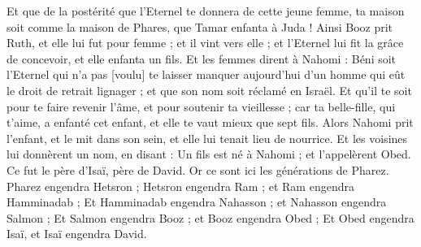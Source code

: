 \begin{multicols}{2}
Et que de la postérité que l'Eternel te donnera de cette jeune femme, ta maison soit comme la maison de Phares, que Tamar enfanta à Juda !
Ainsi Booz prit Ruth, et elle lui fut pour femme ; et il vint vers elle ; et l'Eternel lui fit la grâce de concevoir, et elle enfanta un fils.
Et les femmes dirent à Nahomi : Béni soit l'Eternel qui n'a pas [voulu] te laisser manquer aujourd'hui d'un homme qui eût le droit de retrait lignager ; et que son nom soit réclamé en Israël.
Et qu'il te soit pour te faire revenir l'âme, et pour soutenir ta vieillesse ; car ta belle-fille, qui t'aime, a enfanté cet enfant, et elle te vaut mieux que sept fils.
Alors Nahomi prit l'enfant, et le mit dans son sein, et elle lui tenait lieu de nourrice.
Et les voisines lui donnèrent un nom, en disant : Un fils est né à Nahomi ; et l'appelèrent Obed. Ce fut le père d'Isaï, père de David.
Or ce sont ici les générations de Pharez. Pharez engendra Hetsron ;
Hetsron engendra Ram ; et Ram engendra Hamminadab ;
Et Hamminadab engendra Nahasson ; et Nahasson engendra Salmon ;
Et Salmon engendra Booz ; et Booz engendra Obed ;
Et Obed engendra Isaï, et Isaï engendra David.
\PPE{}
\end{multicols}
